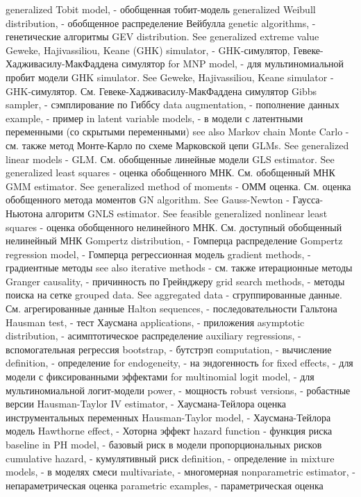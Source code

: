 generalized Tobit model, - обобщенная тобит-модель
generalized Weibull distribution, - обобщенное распределение Вейбулла
genetic algorithms, - генетические алгоритмы
GEV distribution. See generalized extreme value 
Geweke, Hajivassiliou, Keane (GHK) simulator, - GHK-симулятор, Гевеке-Хадживасилу-МакФаддена симулятор
for MNP model, - для мультиномиальной пробит модели
GHK simulator. See Geweke, Hajivassiliou, Keane simulator - GHK-симулятор. См. Гевеке-Хадживасилу-МакФаддена симулятор
Gibbs sampler, - сэмплирование по Гиббсу
data augmentation, - пополнение данных
example, - пример
in latent variable models, - в модели с латентными переменными (со скрытыми переменными)
see also Markov chain Monte Carlo - см. также метод Монте-Карло по схеме Марковской цепи
GLMs. See generalized linear models - GLM. См. обобщенные линейные модели
GLS estimator. See generalized least squares - оценка обобщенного МНК. См. обобщенный МНК
GMM estimator. See generalized method of moments - ОММ оценка. См. оценка обобщенного метода моментов
GN algorithm. See Gauss-Newton - Гаусса-Ньютона алгоритм
GNLS estimator. See feasible generalized nonlinear least squares - оценка обобщенного нелинейного МНК. См. доступный обобщенный нелинейный МНК
Gompertz distribution, - Гомперца распределение
Gompertz regression model, - Гомперца регрессионная модель
gradient methods, - градиентные методы
see also iterative methods - см. также итерационные методы
Granger causality, - причинность по Грейнджеру
grid search methods, - методы поиска на сетке
grouped data. See aggregated data - сгруппированные данные. См. агрегированные данные
Halton sequences, - последовательности Гальтона
Hausman test, - тест Хаусмана
applications, - приложения
asymptotic distribution, - асимптотическое распределение
auxiliary regressions, - вспомогательная регрессия
bootstrap, - бутстрэп
computation, - вычисление
definition, - определение
for endogeneity, - на эндогенность
for fixed effects, - для модели с фиксированными эффектами
for multinomial logit model, - для мультиномиальной логит-модели
power, - мощность
robust versions, - робастные версии
Hausman-Taylor IV estimator, - Хаусмана-Тейлора оценка инструментальных переменных
Hausman-Taylor model, - Хаусмана-Тейлора модель
Hawthorne effect, - Хоторна эффект
hazard function - функция риска
baseline in PH model, - базовый риск в модели пропорциональных рисков
cumulative hazard, - кумулятивный риск
definition, - определение
in mixture models, - в моделях смеси
multivariate, - многомерная
nonparametric estimator, - непараметрическая оценка
parametric examples, - параметрическая оценка
